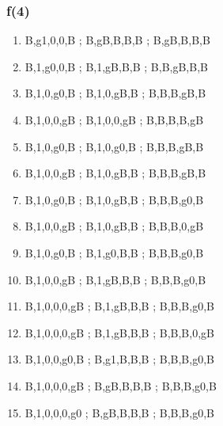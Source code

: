 \documentclass[leqno]{article}
\begin{document}
            \subsubsection{f(4)}
                \begin{enumerate}
                    \item {}              {B,g1,0,0,B ; B,gB,B,B,B ; B,gB,B,B,B}
                    \item {}             {B,1,g0,0,B ; B,1,gB,B,B ; B,B,gB,B,B}
                    \item {}            {B,1,0,g0,B ; B,1,0,gB,B ; B,B,B,gB,B}
                    \item {}          {B,1,0,0,gB ; B,1,0,0,gB ; B,B,B,B,gB}
                    \item {}            {B,1,0,g0,B ; B,1,0,g0,B ; B,B,B,gB,B}
                    \item {}           {B,1,0,0,gB ; B,1,0,gB,B ; B,B,B,gB,B}
                    \item {}            {B,1,0,g0,B ; B,1,0,gB,B ; B,B,B,g0,B}
                    \item {}          {B,1,0,0,gB ; B,1,0,gB,B ; B,B,B,0,gB}
                    \item {}             {B,1,0,g0,B ; B,1,g0,B,B ; B,B,B,g0,B}
                    \item {}            {B,1,0,0,gB ; B,1,gB,B,B ; B,B,B,g0,B}
                    \item {}        {B,1,0,0,0,gB ; B,1,gB,B,B ; B,B,B,g0,B}
                    \item {}       {B,1,0,0,0,gB ; B,1,gB,B,B ; B,B,B,0,gB}
                    \item {}          {B,1,0,0,g0,B ; B,g1,B,B,B ; B,B,B,g0,B}
                    \item {}         {B,1,0,0,0,gB ; B,gB,B,B,B ; B,B,B,g0,B}
                    \item {}         {B,1,0,0,0,g0 ; B,gB,B,B,B ; B,B,B,g0,B}

\end{enumerate}
\end{document}
